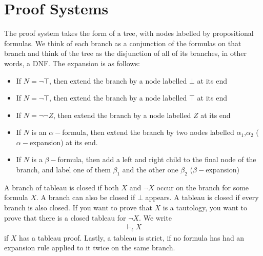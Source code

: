 \documentclass[a4paper]{article}
\theoremstyle{plain}
\theoremstyle{definition}
\newtheorem{defn}{Definition}[section]
\theoremstyle{remark}
\begin{document}
\section{Proof Systems}
\begin{tcolorbox}[colback=black!3!white,colframe=black!60!white,title=\begin{defn}Semantic Tableau \label{Semantic Tableau}\end{defn}]
The proof system takes the form of a tree, with nodes labelled by propositional formulas. We think of each branch as a conjunction of the formulas on that branch and think of the tree as the disjunction of all of its branches, in other words, a DNF. The expansion is as follows:
\begin{itemize}
	\item If $N = \neg \top$, then extend the branch by a node labelled $\bot$ at its end
	\item If $N = \neg \top$, then extend the branch by a node labelled $\top$ at its end
	\item If $N = \neg \neg Z$, then extend the branch by a node labelled $Z$ at its end
	\item If $N$ is an $\alpha-$formula, then extend the branch by two nodes labelled $\alpha_1$,$\alpha_2$ ($\alpha-$expansion) at its end.
	\item If $N$ is a $\beta-$formula, then add a left and right child to the final node of the branch, and label one of them $\beta_1$ and the other one $\beta_2$ ($\beta-$expansion)
\end{itemize}
A branch of tableau is closed if both $X$ and $\neg X$ occur on the branch for some formula $X$. A branch can also be closed if $\bot$ appears. A tableau is closed if every branch is also closed. If you want to prove that $X$ is a tautology, you want to prove that there is a closed tableau for $\neg X$. We write
\begin{align}
	\vdash_t X
\end{align}
if $X$ has a tableau proof. Lastly, a tableau is strict, if no formula has had an expansion rule applied to it twice on the same branch.
\end{tcolorbox}
\end{document}
